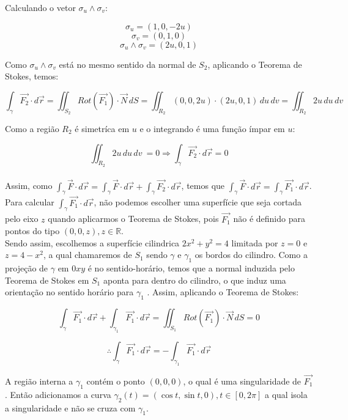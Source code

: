\documentclass[12pt,a4paper]{article}
\begin{document}
Calculando o vetor $\sigma_{u} \wedge \sigma_{v}$:

\[ \sigma_u = (1,0, -2u ) \]
\[ \sigma_v = (0,1, 0 ) \]
\[  \sigma_u \wedge \sigma_v = ( 2u, 0, 1 ) \] 

Como $\sigma_u \wedge \sigma_v$ está no mesmo sentido da normal de $S_2$, aplicando o Teorema de Stokes, temos:

\[ \int_{\gamma} \vec{F_2} \cdot d\vec{r} = \iint_{S_2} Rot(\vec{F_1}) \cdot \vec{N} \,dS = \iint_{R_2} (0, 0, 2u) \cdot ( 2u, 0, 1 )  \,du \,dv =  \iint_{R_2} 2u \,du \,dv\]

Como a região $R_2$ é simetríca em $u$ e o integrando é uma função ímpar em $u$:

\[ \iint_{R_2} 2u \,du \,dv\ = 0 \Rightarrow  \int_{\gamma} \vec{F_2} \cdot d\vec{r} = 0 \] \\

Assim, como $ \displaystyle  \int_{\gamma} \vec{F} \cdot d\vec{r} =  \int_{\gamma} \vec{F} \cdot d\vec{r} +  \int_{\gamma} \vec{F_2} \cdot d\vec{r} $, temos que $ \displaystyle \int_{\gamma} \vec{F} \cdot d\vec{r} =  \int_{\gamma} \vec{F_1} \cdot d\vec{r} $. \\

Para calcular $ \displaystyle \int_{\gamma} \vec{F_1} \cdot d\vec{r} $, não podemos escolher uma superfície que seja cortada pelo eixo $z$ quando aplicarmos o Teorema de Stokes, pois $\vec{F_1}$ não é definido para pontos do tipo $(0,0,z), z \in \mathbb{R} $. \\

Sendo assim, escolhemos a superfície cilindrica $2x^2 + y^2 = 4$ limitada por $z = 0 $ e $z = 4 - x^2 $, a qual chamaremos de $S_1$ sendo $\gamma$ e $\gamma_1$ os bordos do cilindro. Como a projeção de $\gamma $ em $0xy$ é no sentido-horário, temos que a normal induzida pelo Teorema de Stokes em $S_1$ aponta para dentro do cilindro, o que induz uma orientação no sentido horário para $ \gamma_1$ . Assim, aplicando o Teorema de Stokes:

\[  \int_{\gamma} \vec{F_1} \cdot d\vec{r} + \int_{\gamma_1} \vec{F_1} \cdot d\vec{r} = \iint_{S_1} Rot(\vec{F_1}) \cdot \vec{N} \,dS = 0 \]


\[ \therefore \int_{\gamma} \vec{F_1} \cdot d\vec{r} = - \int_{\gamma_1} \vec{F_1} \cdot d\vec{r} \]

A região interna a $\gamma_1$ contém o ponto $(0,0,0)$, o qual é uma singularidade de $\vec{F_1}$. Então adicionamos a curva $\gamma_2 (t) = ( \cos t, \sin t, 0), t \in [0, 2 \pi] $ a qual isola a singularidade e não se cruza com  $\gamma_1$.
\end{document}
